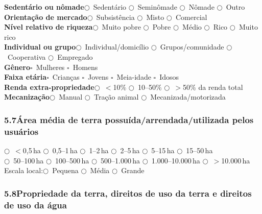 \noindent\textbf{Sedentário ou nômade}\quad $\bigcirc$~Sedentário \quad $\bigcirc$~Seminômade \quad $\bigcirc$~Nômade \quad $\bigcirc$~Outro\\[4pt]
\textbf{Orientação de mercado}\quad $\bigcirc$~Subsistência \quad $\bigcirc$~Misto \quad $\bigcirc$~Comercial\\[4pt]
\textbf{Nível relativo de riqueza}\quad $\bigcirc$~Muito pobre \quad $\bigcirc$~Pobre \quad $\bigcirc$~Médio \quad $\bigcirc$~Rico \quad $\bigcirc$~Muito rico\\[4pt]
\textbf{Individual ou grupo}\quad $\bigcirc$~Individual/domicílio \quad $\bigcirc$~Grupos/comunidade \quad $\bigcirc$~Cooperativa \quad $\bigcirc$~Empregado\\[4pt]
\textbf{Gênero}\quad $\square$~Mulheres \quad $\square$~Homens\\[4pt]
\textbf{Faixa etária}\quad $\square$~Crianças \quad $\square$~Jovens \quad $\square$~Meia-idade \quad $\square$~Idosos\\[4pt]
\textbf{Renda extra-propriedade}\quad $\bigcirc$~$<$10\% \quad $\bigcirc$~10--50\% \quad $\bigcirc$~$>$50\% da renda total\\[4pt]
\textbf{Mecanização}\quad $\bigcirc$~Manual \quad $\bigcirc$~Tração animal \quad $\bigcirc$~Mecanizada/motorizada

\subsubsection*{5.7\quad Área média de terra possuída/arrendada/utilizada pelos usuários}

$\bigcirc$~$<$0,5\,ha \quad $\bigcirc$~0,5--1\,ha \quad $\bigcirc$~1--2\,ha \quad $\bigcirc$~2--5\,ha \quad $\bigcirc$~5--15\,ha \quad $\bigcirc$~15--50\,ha\\
$\bigcirc$~50--100\,ha \quad $\bigcirc$~100--500\,ha \quad $\bigcirc$~500--1.000\,ha \quad $\bigcirc$~1.000--10.000\,ha \quad $\bigcirc$~$>$10.000\,ha\\[4pt]
Escala local:\quad $\bigcirc$~Pequena \quad $\bigcirc$~Média \quad $\bigcirc$~Grande

\subsubsection*{5.8\quad Propriedade da terra, direitos de uso da terra e direitos de uso da água}

